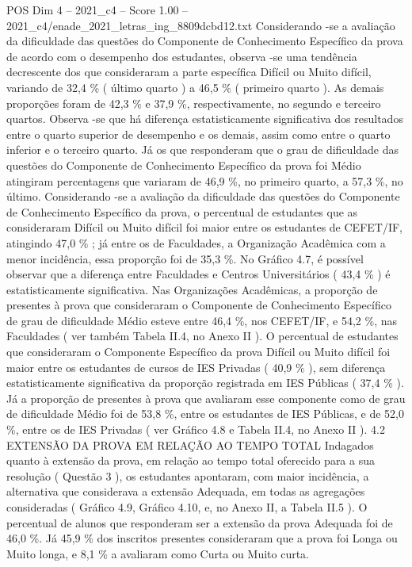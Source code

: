 \begin{textsample}{POS Dim 4 – 2021\_c4 – Score 1.00 – 2021\_c4/enade\_2021\_letras\_ing\_8809dcbd12.txt}
Considerando -se a avaliação da dificuldade das questões do Componente de Conhecimento Específico da prova de acordo com o desempenho dos estudantes, observa -se uma tendência decrescente dos que consideraram a parte específica Difícil ou Muito difícil, variando de 32,4 \% ( último quarto ) a 46,5 \% ( primeiro quarto ).
As demais proporções foram de 42,3 \% e 37,9 \%, respectivamente, no segundo e terceiro quartos.
Observa -se que há diferença estatisticamente significativa dos resultados entre o quarto superior de desempenho e os demais, assim como entre o quarto inferior e o terceiro quarto.
Já os que responderam que o grau de dificuldade das questões do Componente de Conhecimento Específico da prova foi Médio atingiram percentagens que variaram de 46,9 \%, no primeiro quarto, a 57,3 \%, no último.
Considerando -se a avaliação da dificuldade das questões do Componente de Conhecimento Específico da prova, o percentual de estudantes que as consideraram Difícil ou Muito difícil foi maior entre os estudantes de CEFET/IF, atingindo 47,0 \% ; já entre os de Faculdades, a Organização Acadêmica com a menor incidência, essa proporção foi de 35,3 \%.
No Gráfico 4.7, é possível observar que a diferença entre Faculdades e Centros Universitários ( 43,4 \% ) é estatisticamente significativa.
Nas Organizações Acadêmicas, a proporção de presentes à prova que consideraram o Componente de Conhecimento Específico de grau de dificuldade Médio esteve entre 46,4 \%, nos CEFET/IF, e 54,2 \%, nas Faculdades ( ver também Tabela II.4, no Anexo II ).
O percentual de estudantes que consideraram o Componente Específico da prova Difícil ou Muito difícil foi maior entre os estudantes de cursos de IES Privadas ( 40,9 \% ), sem diferença estatisticamente significativa da proporção registrada em IES Públicas ( 37,4 \% ).
Já a proporção de presentes à prova que avaliaram esse componente como de grau de dificuldade Médio foi de 53,8 \%, entre os estudantes de IES Públicas, e de 52,0 \%, entre os de IES Privadas ( ver Gráfico 4.8 e Tabela II.4, no Anexo II ). 4.2 EXTENSÃO DA PROVA EM RELAÇÃO AO TEMPO TOTAL Indagados quanto à extensão da prova, em relação ao tempo total oferecido para a sua resolução ( Questão 3 ), os estudantes apontaram, com maior incidência, a alternativa que considerava a extensão Adequada, em todas as agregações consideradas ( Gráfico 4.9, Gráfico 4.10, e, no Anexo II, a Tabela II.5 ).
O percentual de alunos que responderam ser a extensão da prova Adequada foi de 46,0 \%.
Já 45,9 \% dos inscritos presentes consideraram que a prova foi Longa ou Muito longa, e 8,1 \% a avaliaram como Curta ou Muito curta.

\end{textsample}
